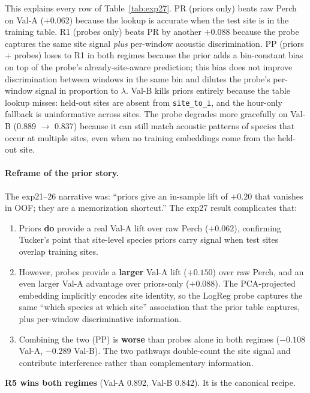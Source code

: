 This explains every row of Table~\ref{tab:exp27}. PR (priors only)
beats raw Perch on Val-A ($+0.062$) because the lookup is accurate
when the test site is in the training table. R1 (probes only) beats
PR by another $+0.088$ because the probe captures the same site
signal \emph{plus} per-window acoustic discrimination. PP (priors
$+$ probes) loses to R1 in both regimes because the prior adds a
bin-constant bias on top of the probe's already-site-aware
prediction; this bias does not improve discrimination between windows
in the same bin and dilutes the probe's per-window signal in
proportion to $\lambda$. Val-B kills priors entirely because the
table lookup misses: held-out sites are absent from
\texttt{site\_to\_i}, and the hour-only fallback is uninformative
across sites. The probe degrades more gracefully on Val-B
(0.889 $\to$ 0.837) because it can still match acoustic patterns of
species that occur at multiple sites, even when no training
embeddings come from the held-out site.

\paragraph{Reframe of the prior story.} The exp21--26 narrative was:
``priors give an in-sample lift of $+0.20$ that vanishes in OOF; they
are a memorization shortcut.'' The exp27 result complicates that:
\begin{enumerate}
\item Priors \textbf{do} provide a real Val-A lift over raw Perch
($+0.062$), confirming Tucker's point that site-level species
priors carry signal when test sites overlap training sites.
\item However, probes provide a \textbf{larger} Val-A lift ($+0.150$)
over raw Perch, and an even larger Val-A advantage over
priors-only ($+0.088$). The PCA-projected embedding implicitly
encodes site identity, so the LogReg probe captures the same
``which species at which site'' association that the prior table
captures, plus per-window discriminative information.
\item Combining the two (PP) is \textbf{worse} than probes alone in
both regimes ($-0.108$ Val-A, $-0.289$ Val-B). The two pathways
double-count the site signal and contribute interference rather
than complementary information.
\end{enumerate}

\textbf{R5 wins both regimes} (Val-A 0.892, Val-B 0.842). It is the
canonical recipe.


